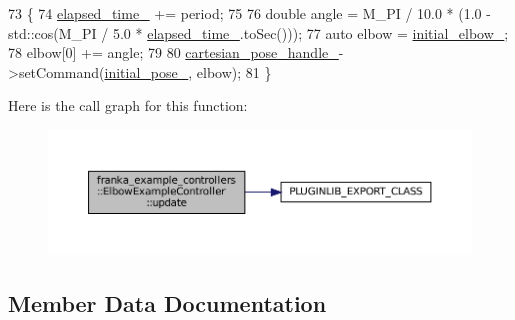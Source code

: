\begin{DoxyCode}
73                                                                                \{
74   \hyperlink{classfranka__example__controllers_1_1ElbowExampleController_adbacbe4e9d5314fc0a881f16b7ffa3c2}{elapsed\_time\_} += period;
75 
76   \textcolor{keywordtype}{double} angle = M\_PI / 10.0 * (1.0 - std::cos(M\_PI / 5.0 * \hyperlink{classfranka__example__controllers_1_1ElbowExampleController_adbacbe4e9d5314fc0a881f16b7ffa3c2}{elapsed\_time\_}.toSec()));
77   \textcolor{keyword}{auto} elbow = \hyperlink{classfranka__example__controllers_1_1ElbowExampleController_a5addb6a766aa1ad5e193796976307ef1}{initial\_elbow\_};
78   elbow[0] += angle;
79 
80   \hyperlink{classfranka__example__controllers_1_1ElbowExampleController_a911a7a82e55ba8f023ec8c0a9c8d2bd9}{cartesian\_pose\_handle\_}->setCommand(\hyperlink{classfranka__example__controllers_1_1ElbowExampleController_a93ff73dad84295cd4c822b6bb843bc3c}{initial\_pose\_}, elbow);
81 \}
\end{DoxyCode}
Here is the call graph for this function\+:
\nopagebreak
\begin{figure}[H]
\begin{center}
\leavevmode
\includegraphics[width=350pt]{classfranka__example__controllers_1_1ElbowExampleController_a0f3e4ef04d7d4eba6019ae68c621a3a0_cgraph}
\end{center}
\end{figure}


\subsection{Member Data Documentation}
\mbox{\label{classfranka__example__controllers_1_1ElbowExampleController_a911a7a82e55ba8f023ec8c0a9c8d2bd9}} 
